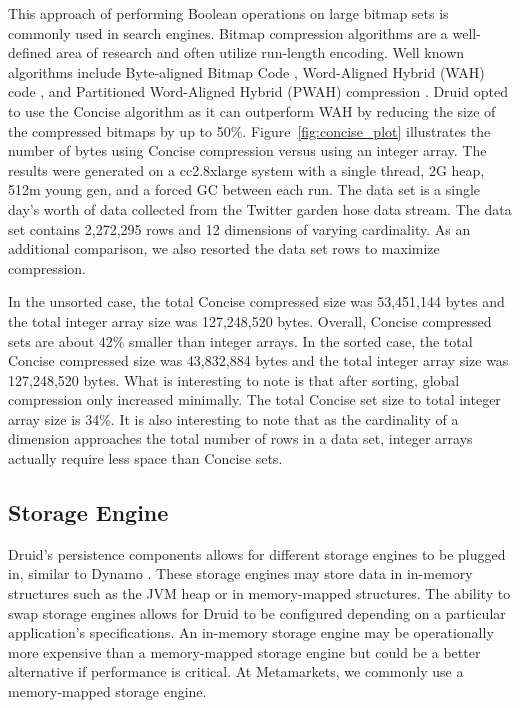 \documentclass{vldb}
\begin{document}
This approach of performing Boolean operations on large bitmap sets is
commonly used in search engines. Bitmap compression algorithms are a
well-defined area of research and often utilize run-length
encoding. Well known algorithms include Byte-aligned Bitmap Code \cite{antoshenkov1995byte},
Word-Aligned Hybrid (WAH) code \cite{wu2006optimizing}, and Partitioned Word-Aligned
Hybrid (PWAH) compression \cite{van2011memory}. Druid opted to use the Concise
algorithm \cite{colantonio2010concise} as it can outperform WAH by reducing the size of the
compressed bitmaps by up to 50\%.  Figure~\ref{fig:concise_plot} illustrates the number of
bytes using Concise compression versus using an integer array. The
results were generated on a cc2.8xlarge system with a single thread,
2G heap, 512m young gen, and a forced GC between each run. The data
set is a single day’s worth of data collected from the Twitter garden
hose \cite{twitter2013} data stream. The data set contains 2,272,295 rows and 12
dimensions of varying cardinality. As an additional comparison, we
also resorted the data set rows to maximize compression.

In the unsorted case, the total Concise compressed size was 
53,451,144 bytes and the total integer array size was 127,248,520 bytes. Overall,
Concise compressed sets are about 42\% smaller than integer arrays.
In the sorted case, the total Concise compressed size was 43,832,884
bytes and the total integer array size was 127,248,520 bytes.  What is
interesting to note is that after sorting, global compression only
increased minimally. The total Concise set size to total integer array
size is 34\%. It is also interesting to note that as the cardinality
of a dimension approaches the total number of rows in a data set,
integer arrays actually require less space than Concise sets.

\subsection{Storage Engine}
Druid’s persistence components allows for different storage engines to
be plugged in, similar to Dynamo \cite{decandia2007dynamo}. These storage engines may store
data in in-memory structures such as the JVM heap or in memory-mapped
structures. The ability to swap storage engines allows for Druid to be
configured depending on a particular application’s specifications. An
in-memory storage engine may be operationally more expensive than a
memory-mapped storage engine but could be a better alternative if
performance is critical. At Metamarkets, we commonly use a
memory-mapped storage engine.
\end{document}
